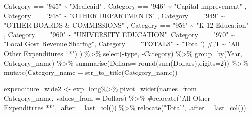 \documentclass[
  letterpaper,
  DIV=11,
  numbers=noendperiod]{scrreport}
\newenvironment{Shaded}{\begin{snugshade}}{\end{snugshade}}
\newcommand{\AttributeTok}[1]{\textcolor[rgb]{0.40,0.45,0.13}{#1}}
\newcommand{\CommentTok}[1]{\textcolor[rgb]{0.37,0.37,0.37}{#1}}
\newcommand{\DecValTok}[1]{\textcolor[rgb]{0.68,0.00,0.00}{#1}}
\newcommand{\FunctionTok}[1]{\textcolor[rgb]{0.28,0.35,0.67}{#1}}
\newcommand{\NormalTok}[1]{\textcolor[rgb]{0.00,0.23,0.31}{#1}}
\newcommand{\OtherTok}[1]{\textcolor[rgb]{0.00,0.23,0.31}{#1}}
\newcommand{\SpecialCharTok}[1]{\textcolor[rgb]{0.37,0.37,0.37}{#1}}
\newcommand{\StringTok}[1]{\textcolor[rgb]{0.13,0.47,0.30}{#1}}
\begin{document}
\begin{Shaded}
\begin{Highlighting}[]
\NormalTok{             Category }\SpecialCharTok{==} \StringTok{"945"} \SpecialCharTok{\textasciitilde{}} \StringTok{"Medicaid"}\NormalTok{ ,}
\NormalTok{             Category }\SpecialCharTok{==} \StringTok{"946"} \SpecialCharTok{\textasciitilde{}} \StringTok{"Capital Improvement"}\NormalTok{ , }
\NormalTok{             Category }\SpecialCharTok{==} \StringTok{"948"} \SpecialCharTok{\textasciitilde{}} \StringTok{"OTHER DEPARTMENTS"}\NormalTok{ ,}
\NormalTok{             Category }\SpecialCharTok{==} \StringTok{"949"} \SpecialCharTok{\textasciitilde{}} \StringTok{"OTHER BOARDS \& COMMISSIONS"}\NormalTok{ ,}
\NormalTok{             Category }\SpecialCharTok{==} \StringTok{"959"} \SpecialCharTok{\textasciitilde{}} \StringTok{"K{-}12 Education"}\NormalTok{ ,}
\NormalTok{             Category }\SpecialCharTok{==} \StringTok{"960"} \SpecialCharTok{\textasciitilde{}} \StringTok{"UNIVERSITY EDUCATION"}\NormalTok{,}
\NormalTok{             Category }\SpecialCharTok{==} \StringTok{"970"} \SpecialCharTok{\textasciitilde{}} \StringTok{"Local Govt Revenue Sharing"}\NormalTok{,}
\NormalTok{          Category }\SpecialCharTok{==} \StringTok{"TOTALS"} \SpecialCharTok{\textasciitilde{}} \StringTok{"Total"}\NormalTok{) }\CommentTok{\#,T \textasciitilde{} "All Other Expenditures **")}
\NormalTok{           ) }\SpecialCharTok{\%\textgreater{}\%} 
  \FunctionTok{select}\NormalTok{(}\SpecialCharTok{{-}}\NormalTok{type, }\SpecialCharTok{{-}}\NormalTok{Category) }\SpecialCharTok{\%\textgreater{}\%} 
  \FunctionTok{group\_by}\NormalTok{(Year, Category\_name) }\SpecialCharTok{\%\textgreater{}\%} 
  \FunctionTok{summarise}\NormalTok{(}\AttributeTok{Dollars=} \FunctionTok{round}\NormalTok{(}\FunctionTok{sum}\NormalTok{(Dollars),}\AttributeTok{digits=}\DecValTok{2}\NormalTok{)) }\SpecialCharTok{\%\textgreater{}\%} 
  \FunctionTok{mutate}\NormalTok{(}\AttributeTok{Category\_name =} \FunctionTok{str\_to\_title}\NormalTok{(Category\_name))}

\NormalTok{expenditure\_wide2 }\OtherTok{\textless{}{-}}\NormalTok{ exp\_long}\SpecialCharTok{\%\textgreater{}\%} 
  \FunctionTok{pivot\_wider}\NormalTok{(}\AttributeTok{names\_from =}\NormalTok{ Category\_name, }
              \AttributeTok{values\_from =}\NormalTok{ Dollars) }\SpecialCharTok{\%\textgreater{}\%}
  \CommentTok{\#relocate("All Other Expenditures **", .after = last\_col()) \%\textgreater{}\%}
  \FunctionTok{relocate}\NormalTok{(}\StringTok{"Total"}\NormalTok{, }\AttributeTok{.after =}  \FunctionTok{last\_col}\NormalTok{())}
\end{Highlighting}
\end{Shaded}
\end{document}
